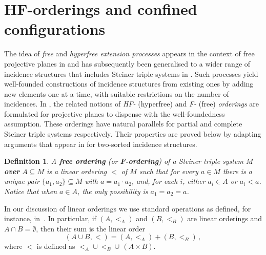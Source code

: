 \documentclass[a4paper, 11pt]{article}
\theoremstyle{note}
\newtheorem{df}[thm]{Definition}
\begin{document}
	
	\section{HF-orderings and confined configurations} \label{section3}
	
	The idea of \textit{free} and \textit{hyperfree extension processes} appears in the context of free projective planes in \cite{sieben} and has subsequently been generalised to a wider range of incidence structures that includes Steiner triple systems in \cite{funk}.  Such processes yield well-founded constructions of incidence structures from existing ones by adding new elements one at a time, with suitable restrictions on the number of incidences. In \cite{hyttpao}, the related notions of \textit{HF-} (hyperfree) and \textit{F-} (free) \textit{orderings} are formulated for projective planes to dispense with the well-foundedness assumption. These orderings have natural parallels for partial and complete Steiner triple systems respectively.  Their properties are proved below by adapting arguments that appear in \cite{funk, hyttpao} for two-sorted incidence structures.
	
	
	\begin{df}
		A \textbf{free ordering}  (or \textbf{F-ordering})   of a Steiner triple system $M$ \textbf{over} $A\subseteq M$ is a linear ordering $<$ of $M$ such that for every $a\in M$  there is a unique pair $\{a_1,a_2\}\subseteq M$ with $a=a_1\cdot a_2$,  and, for each $i$, either $a_i\in A$ or $a_i<a$. Notice that when $a\in A$, the only possibility is $a_1=a_2=a$.
	\end{df}
	
	In our discussion of linear orderings we use standard operations as defined, for instance, in~\cite{rosenstein}. In particular, if $(A,<_A)$ and $(B,<_B)$ are linear orderings and $A\cap B=\emptyset$, then their sum  is the linear order 
		\[(A\cup B, <)= (A,<_A) + (B,<_B) \, ,\] 
where $<$ is defined as $<_A\cup <_B \cup \, (A\times B)$.  
	
\end{document}
